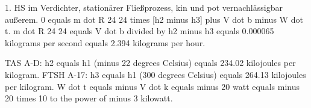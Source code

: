 1. HS im Verdichter, stationärer Fließprozess, kin und pot vernachlässigbar außerem.
0 equals m dot R 24 24 times [h2 minus h3] plus V dot b minus W dot t.
m dot R 24 24 equals V dot b divided by h2 minus h3 equals 0.000065 kilograms per second equals 2.394 kilograms per hour.

TAS A-D:
h2 equals h1 (minus 22 degrees Celsius) equals 234.02 kilojoules per kilogram.
FTSH A-17:
h3 equals h1 (300 degrees Celsius) equals 264.13 kilojoules per kilogram.
W dot t equals minus V dot k equals minus 20 watt equals minus 20 times 10 to the power of minus 3 kilowatt.